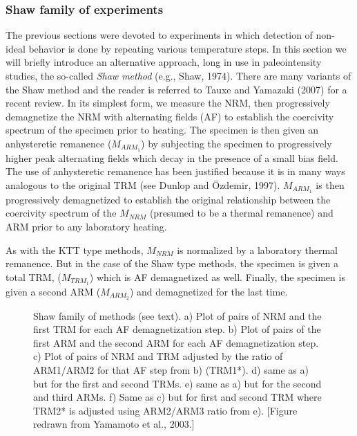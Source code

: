 \subsubsection{Shaw family of experiments}
\label{sect:shaw}


The previous sections were devoted to experiments in which detection of non-ideal behavior is done by repeating various temperature steps.    In this section we will briefly introduce an alternative approach, long in use in paleointensity studies, the so-called 
{\it Shaw method}  (e.g., 
Shaw, 1974).  \nocite{shaw74}There are many variants of the Shaw method and the reader is referred to 
Tauxe and Yamazaki (2007)  \nocite{tauxe07} for a recent review.  In its simplest form, we measure the NRM, then progressively demagnetize the NRM with alternating fields (AF) to establish the coercivity spectrum of the specimen prior to heating.  The specimen is then given  an anhysteretic remanence ($M_{ARM_1}$) by subjecting the specimen to progressively higher peak alternating fields which decay in the presence of a small bias field.  The use of anhysteretic remanence   has been justified because it  is in many ways  analogous to the original TRM (see 
Dunlop and \"Ozdemir, 1997).   $M_{ARM_1}$ is then progressively demagnetized to establish the original relationship between the coercivity spectrum of the $M_{NRM}$ (presumed to be a thermal remanence) and ARM prior to any laboratory heating. 

As with the KTT type  methods, $M_{NRM}$ is normalized by a laboratory thermal remanence.  But in the case of the Shaw type methods, the specimen is given a total TRM, ($M_{TRM_1}$) which is AF demagnetized as well.  Finally, the specimen is given a second ARM ($M_{ARM_2}$) and demagnetized for the last  time.    

\begin{figure}[htb]
\epsfxsize 14cm
\centering {}
\caption{ Shaw family of methods (see text).    a) Plot of pairs of NRM and the first TRM for each AF demagnetization step.  b) Plot of pairs of the first ARM and the second ARM for each AF demagnetization step.  c) Plot of pairs of NRM and TRM adjusted by the ratio of ARM1/ARM2 for that AF step from b) (TRM1*).  d) same as a) but for the first and second TRMs.  e) same as a) but for the second and  third ARMs.  f) Same as c) but for first and second TRM where TRM2* is adjusted using ARM2/ARM3 ratio from e). [Figure redrawn from Yamamoto et al., 2003.]}
\label{fig:shaw-dd}
\end{figure}

